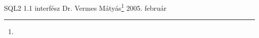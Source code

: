 
\pagetitle%
{SQL2 1.1 interfész}%
{Dr. Vermes Mátyás\footnote{\ComFirm}}%
{2005. február}







\appendix





